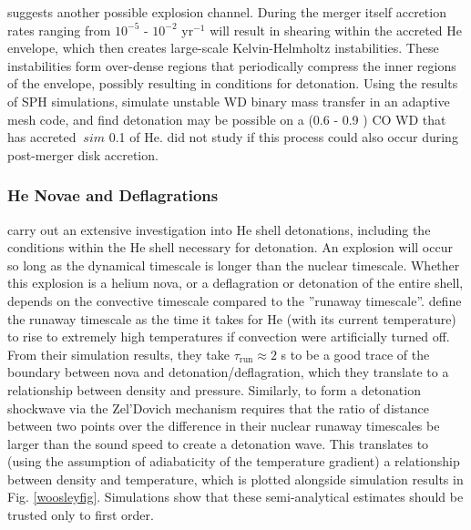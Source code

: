 \cite{guil+10} suggests another possible explosion channel.  During the merger itself accretion rates ranging from $10^{-5}$ - $10^{-2}$ {\Msun} yr$^{-1}$ will result in shearing within the accreted He envelope, which then creates large-scale Kelvin-Helmholtz instabilities.  These instabilities form over-dense regions that periodically compress the inner regions of the envelope, possibly resulting in conditions for detonation.  Using the results of SPH simulations, \cite{guil+10} simulate unstable WD binary mass transfer in an adaptive mesh code, and find detonation may be possible on a (0.6 - 0.9 {\Msun}) CO WD that has accreted $~sim$ 0.1 {\Msun} of He.  \citeauthor{guil+10} did not study if this process could also occur during post-merger disk accretion.

\subsubsection{He Novae and Deflagrations}

\cite{woosk10} carry out an extensive investigation into He shell detonations, including the conditions within the He shell necessary for detonation.  An explosion will occur so long as the dynamical timescale is longer than the nuclear timescale.  Whether this explosion is a helium nova, or a deflagration or detonation of the entire shell, depends on the convective timescale compared to the ''runaway timescale''.  \citeauthor{woosk10} define the runaway timescale as the time it takes for He (with its current temperature) to rise to extremely high temperatures if convection were artificially turned off.  From their simulation results, they take $\tau_{\mathrm{run}} \approx 2$ s to be a good trace of the boundary between nova and detonation/deflagration, which they translate to a relationship between density and pressure.  Similarly, to form a detonation shockwave via the Zel'Dovich mechanism requires that the ratio of distance between two points over the difference in their nuclear runaway timescales be larger than the sound speed to create a detonation wave.  This translates to (using the assumption of adiabaticity of the temperature gradient) a relationship between density and temperature, which is plotted alongside simulation results in Fig. \ref{woosleyfig}.  Simulations show that these semi-analytical estimates should be trusted only to first order.

